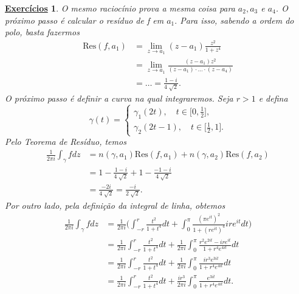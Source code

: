 \documentclass{article}
\newtheorem*{exer*}{\underline{Exerc\'icios}}
\begin{document}
\begin{exer*}
    O mesmo raciocínio prova a mesma coisa para \(a_{2}, a_3\) e \(a_{4}\). O próximo passo é calcular o resíduo de f em \(a_{1}.\) Para isso, sabendo a ordem
    do polo, basta fazermos 
    \begin{align*}
      \mathrm{Res}(f , a_{1}) &= \lim_{z\to a_{1}}(z-a_{1})\frac{z^{2}}{1+z^{4}}\\
                              &= \lim_{z\to a_{1}}\frac{(z-a_{1})z^{2}}{(z-a_{1})\cdot \dotsc \cdot (z-a_{4})}\\
                              &= \dotsc = \frac{1-i}{4\sqrt[]{2}}.
    \end{align*}
    O próximo passo é definir a curva na qual integraremos. Seja \(r > 1\) e defina 
    \[
      \gamma (t) = \left\{\begin{array}{ll}
          \gamma_{1}(2t),\quad t\in \biggl[0, \frac{1}{2}\biggr],\\
          \gamma_{2}(2t-1),\quad t\in \biggl[\frac{1}{2}, 1\biggr].
      \end{array}\right.
    \]
    Pelo Teorema de Resíduo, temos 
    \begin{align*}
      \frac{1}{2\pi i}\int_{\gamma }^{}f dz &= n(\gamma , a_{1})\mathrm{Res}(f, a_{1}) + n(\gamma , a_{2})\mathrm{Res}(f, a_{2})\\
                                            &= 1 - \frac{1-i}{4\sqrt[]{2}} + 1 - \frac{-1-i}{4\sqrt[]{2}}\\
                                            &= \frac{-2i}{4\sqrt[]{2}} = \frac{-i}{2\sqrt[]{2}}.
    \end{align*}
    Por outro lado, pela definição da integral de linha, obtemos 
    \begin{align*}
      \frac{1}{2\pi i}\int_{\gamma }^{}f dz &= \frac{1}{2\pi i}\biggl(\int_{-r}^{r}\frac{t^{2}}{1+t^{4}}dt + \int_{0}^{\pi }\frac{(\pi e^{it})^{2}}{1 + (re^{it})^{4}}ire^{it}dt\biggr)\\
                                            &= \frac{1}{2\pi i}\int_{-r}^{r}\frac{t^{2}}{1+t^{4}}dt + \frac{1}{2\pi i}\int_{0}^{\pi }\frac{r^{2}e^{2it} - i r e^{it}}{1 + r^{4}e^{4it}}dt\\
                                            &= \frac{1}{2\pi i}\int_{-r}^{r}\frac{t^{2}}{1+t^{4}}dt + \frac{1}{2\pi i}\int_{0}^{\pi }\frac{ir^{3}e^{3it}}{1 + r^{4}e^{4it}}dt\\
                                            &= \frac{1}{2\pi i}\int_{-r}^{r}\frac{t^{2}}{1+t^{4}}dt + \frac{ir^{3}}{2\pi i}\int_{0}^{\pi }\frac{e^{3it}}{1 + r^{4}e^{4it}}dt.

\end{align*}
\end{exer*}
\end{document}
